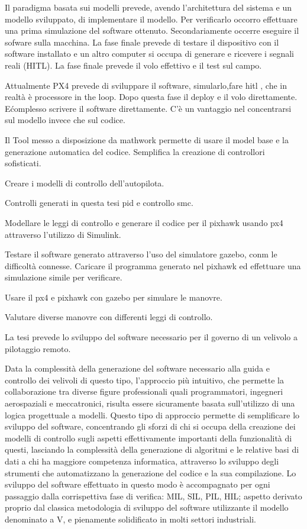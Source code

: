 \begin{scaletta}
	Il paradigma basata sui modelli prevede, avendo l'architettura del sistema e un modello sviluppato, di implementare il modello. Per verificarlo occorro effettuare una prima simulazione del software ottenuto. Secondariamente occerre eseguire il sofware sulla macchina. La fase finale prevede di testare il dispositivo con il  software installato e un altro computer si occupa di generare e ricevere i segnali reali (HITL). La fase finale prevede il volo effettivo e il test sul campo.
	
	Attualmente PX4 prevede di sviluppare il software, simularlo,fare hitl , che in realtà è processore in the loop. Dopo questa fase il deploy e il volo direttamente. E\' complesso scrivere il software direttamente. C'è un vantaggio nel concentrarsi sul modello invece che sul codice.
			
	Il Tool messo a disposizione da mathwork permette di usare il model base e la generazione automatica del codice. Semplifica la creazione di controllori sofisticati.
	
	Creare i modelli di controllo dell'autopilota.

	Controlli generati in questa tesi pid e controllo smc.
	
	Modellare le leggi di controllo e generare il codice per il pixhawk usando px4 attraverso l'utilizzo di Simulink.
	
	Testare il software generato attraverso l'uso del simulatore gazebo, conm le difficoltà connesse. Caricare il programma generato nel pixhawk ed effettuare una simulazione simile per verificare.
	
	Usare il px4 e pixhawk con gazebo per simulare le manovre.
	
	Valutare diverse manovre con differenti leggi di controllo.
	
\end{scaletta}
La tesi prevede lo sviluppo del software necessario per il governo di un velivolo a pilotaggio remoto.

Data la complessità della generazione del software necessario alla guida e controllo dei velivoli di questo tipo, l'approccio più intuitivo, che permette la collaborazione tra diverse figure professionali quali programmatori, ingegneri aerospaziali e meccatronici, risulta essere sicuramente basata sull'utilizzo di una logica progettuale a modelli. Questo tipo di approccio permette di semplificare lo sviluppo del software, concentrando gli sforzi di chi si occupa della creazione dei modelli di controllo sugli aspetti effettivamente importanti della funzionalità di questi, lasciando la complessità della generazione di algoritmi e le relative basi di dati a chi ha maggiore competenza informatica, attraverso lo sviluppo degli strumenti che automatizzano la generazione del codice e la sua compilazione. 
Lo sviluppo del software effettuato in questo modo è accompagnato per ogni passaggio dalla corrispettiva fase di verifica: MIL, SIL, PIL, HIL; aspetto derivato proprio dal classica metodologia di sviluppo del software utilizzante il modello denominato a V, e pienamente solidificato in molti settori industriali.

